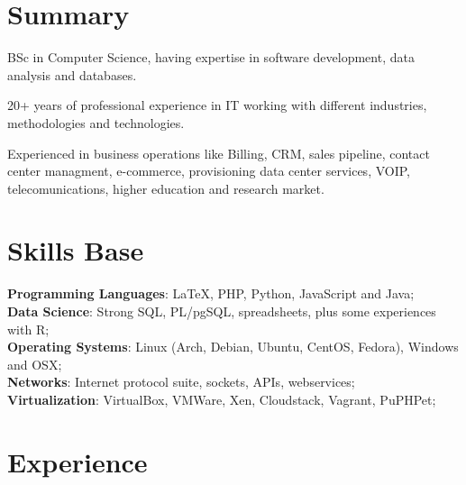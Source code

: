 \documentclass[margin]{res}
\begin{document}
  
\address{London, UK \\ 
         andre.reis@gmail.com \\ 
         Phone: +44 074 8210 1626 \\
         Linkedin: linkedin.com/in/andreleitereis \\
         Github: github.com/reis}

\begin{resume}
\section{Summary} BSc in Computer Science, having expertise in software development, 
                  data analysis and databases.
                        
                  20+ years of professional experience in IT working with different industries, 
                  methodologies and technologies.
                  
                  Experienced in business operations like Billing, CRM, sales pipeline, 
                  contact center managment, e-commerce, provisioning data center services, 
                  VOIP, telecomunications, higher education and research market.

\section{Skills Base}  
  \textbf{Programming Languages}: \LaTeX , PHP, Python, JavaScript and Java;\\
  \textbf{Data Science}: Strong SQL, PL/pgSQL, spreadsheets, plus some experiences with R;\\
  \textbf{Operating Systems}:  Linux (Arch, Debian, Ubuntu, CentOS, Fedora), Windows and OSX;\\
  \textbf{Networks}: Internet protocol suite, sockets, APIs, webservices; \\
  \textbf{Virtualization}: VirtualBox, VMWare, Xen, Cloudstack, Vagrant, PuPHPet;\\
                                  

\section{Experience}


\end{resume}
\end{document}
